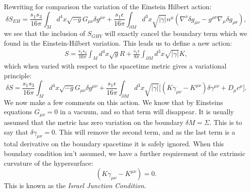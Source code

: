 Rewriting for comparison the variation of the Einstein Hilbert action:
\begin{equation*}
		\delta S_{EH} = \frac{s_1 s_3}{16 \pi} \int_M d^4 x \sqrt{-g} G_{\mu \nu} \delta g^{\mu \nu} + \frac{s_1  \epsilon}{16 \pi} \int_{\partial M} d^3 x \sqrt{|\gamma|} n^\mu (\nabla^\nu \delta g_{\mu \nu} - g^{\rho \sigma} \nabla_\mu \delta g_{\rho \sigma}),
\end{equation*}
we see that the inclusion of $S_{GHY}$ will exactly cancel the boundary term which we found in the Einstein-Hilbert variation. This leads us to define a new action:
\begin{equation}
\label{eq:totact}	
\begin{aligned}
		S = \frac{s_1 s_3}{16 \pi} \int_M d^4 x \sqrt{g} R  + \frac{s_1 \epsilon}{8 \pi} \int_{\partial M} d^3 x \sqrt{|\gamma|} K, 
\end{aligned}
\end{equation}
which when varied with respect to the spacetime metric gives a variational principle:
\begin{equation*}
	\delta S = \frac{s_1 s_3}{16 \pi} \int_M d^4 x \sqrt{-g} G_{\mu \nu} \delta g^{\mu \nu}  + \frac{s_1 \epsilon}{16 \pi} \int_{\partial M} d^3x \sqrt{|\gamma|} \bigg[ \left(K \gamma_{\mu \nu} - K^{\mu \nu} \right) \delta \gamma^{\mu \nu} + D_\mu c^\mu \bigg] .
\end{equation*}
We now make a few comments on this action. We know that by Einsteins equations $G_{\mu \nu} = 0$ in a vacuum, and so that term will disappear. It is usually assumed that the metric has zero variation on the boundary $\delta M = \Sigma$. This is to say that $\delta \gamma_{\mu \nu} = 0$. This will remove the second term, and as the last term is a total derivative on the boundary spacetime it is safely ignored. When this boundary condition isn't assumed, we have a further requirement of the extrinsic curvature of the hypersurface:
\begin{equation*}
	\left(K \gamma_{\mu \nu} - K^{\mu \nu} \right) = 0.
\end{equation*} 
This is known as the \textit{Israel Junction Condition}. 

